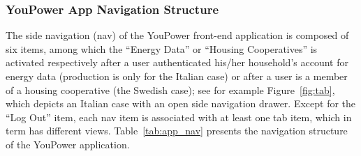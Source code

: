%
%
%
%
%

\subsubsection{YouPower App Navigation Structure}

The side navigation (nav) of the YouPower front-end application is composed of six items, among which the ``Energy Data'' or ``Housing Cooperatives'' is activated respectively after a user authenticated his/her household's account for energy data (production is only for the Italian case) or after a user is a member of a housing cooperative (the Swedish case); see for example Figure~\ref{fig:tab}, which depicts an Italian case with an open side navigation drawer. 
Except for the ``Log Out'' item, each nav item is associated with at least one tab item, which in term has different views. Table~\ref{tab:app_nav} presents the navigation structure of the YouPower application. 

